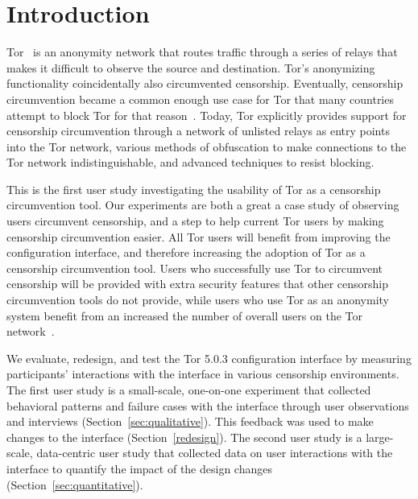 \documentclass[USenglish,oneside,twocolumn]{article}
\begin{document}


\maketitle

\section{Introduction}


Tor~\cite{dingledine2004tor} is an anonymity network that routes traffic through a series of relays
that makes it difficult to observe the source and destination. Tor's anonymizing functionality coincidentally also circumvented censorship. Eventually, censorship circumvention became a common enough use case for Tor that many countries attempt to block Tor for that reason~\cite{winter2012great}. Today, Tor explicitly provides support for censorship circumvention through a network of unlisted relays as entry points into the Tor network, various methods of obfuscation to make connections to the Tor network indistinguishable, and advanced techniques to resist blocking.
 
This is the first user study investigating the usability of Tor as a censorship circumvention tool. Our experiments are both a great a case study of observing users circumvent censorship, and a step to help current Tor users by making censorship circumvention easier. All Tor users will benefit from improving the configuration interface, and therefore increasing the adoption of Tor as a censorship circumvention tool. Users who successfully use Tor to circumvent censorship will be provided with extra security features that other censorship circumvention tools do not provide, while users who use Tor as an anonymity system benefit from an increased the number of overall users on the Tor network~\cite{dingledine2006anonymity}.

We evaluate, redesign, and test the Tor 5.0.3 configuration interface by
measuring participants' interactions with the interface in various censorship environments.
The first user study is a small-scale, one-on-one experiment that collected 
behavioral patterns and failure cases with the interface through user observations
and interviews (Section~\ref{sec:qualitative}). This feedback was used to make changes to the interface (Section~\ref{redesign}). The second user study is a large-scale, data-centric user study
that collected data on user interactions with the interface to quantify the impact of the design changes (Section~\ref{sec:quantitative}).
\end{document}
